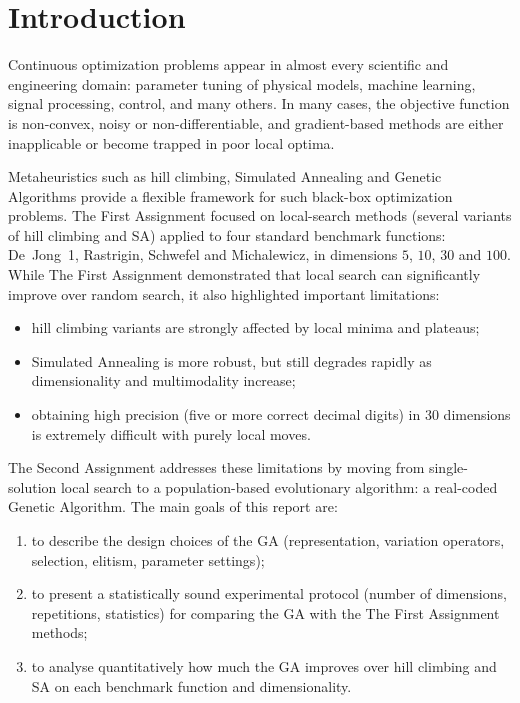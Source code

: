 \documentclass[a4paper,11pt]{article}
\begin{document}
\section{Introduction}

Continuous optimization problems appear in almost every scientific and engineering domain:
parameter tuning of physical models, machine learning, signal processing, control, and many
others. In many cases, the objective function is non-convex, noisy or non-differentiable,
and gradient-based methods are either inapplicable or become trapped in poor local optima.

Metaheuristics such as hill climbing, Simulated Annealing and Genetic Algorithms provide
a flexible framework for such black-box optimization problems. The First Assignment focused
on local-search methods (several variants of hill climbing and SA) applied to four standard
benchmark functions: De~Jong~1, Rastrigin, Schwefel and Michalewicz, in dimensions
$5$, $10$, $30$ and $100$. While The First Assignment demonstrated that local search can significantly improve
over random search, it also highlighted important limitations:
\begin{itemize}
  \item hill climbing variants are strongly affected by local minima and plateaus;
  \item Simulated Annealing is more robust, but still degrades rapidly as dimensionality
        and multimodality increase;
  \item obtaining high precision (five or more correct decimal digits) in 30 dimensions
        is extremely difficult with purely local moves.
\end{itemize}

The Second Assignment addresses these limitations by moving from single-solution local search
to a population-based evolutionary algorithm: a real-coded Genetic Algorithm.
The main goals of this report are:
\begin{enumerate}
  \item to describe the design choices of the GA (representation, variation operators,
        selection, elitism, parameter settings);
  \item to present a statistically sound experimental protocol (number of dimensions,
        repetitions, statistics) for comparing the GA with the The First Assignment methods;
  \item to analyse quantitatively how much the GA improves over hill climbing and SA
        on each benchmark function and dimensionality.
\end{enumerate}
\end{document}
